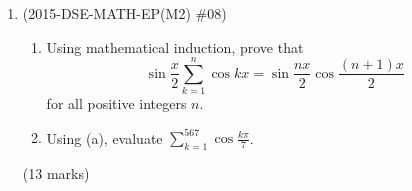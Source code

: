 \documentclass[12pt]{article}
\begin{document}
\begin{enumerate}
            \hrulefill
            
            \hrulefill
            
            \hrulefill
            
            \hrulefill
            
            \hrulefill
            
            \hrulefill
            
            \hrulefill
            
            \hrulefill
            
            \hrulefill
            
            \hrulefill
            
            \hrulefill
            
            \hrulefill
            
            \hrulefill

        \pagebreak
        \item (2015-DSE-MATH-EP(M2) \#08) \begin{enumerate}
            \item Using mathematical induction, prove that $$\sin{\frac{x}{2}}\sum_{k=1}^{n}\cos{kx}=\sin{\frac{nx}{2}}\cos{\frac{(n+1)x}{2}}$$ for all positive integers $n$.
            \item Using (a), evaluate $\displaystyle\sum_{k=1}^{567}\cos{\frac{k\pi}{7}}$.
        \end{enumerate}\hfill(13 marks)
            
            \hrulefill
            
            \hrulefill
            
            \hrulefill
            
            \hrulefill
            
            \hrulefill
            
            \hrulefill
            
            \hrulefill
            
            \hrulefill
            
            \hrulefill
            
            \hrulefill
            
            \hrulefill
            
            \hrulefill
            
            \hrulefill
            

\end{enumerate}
\end{document}
